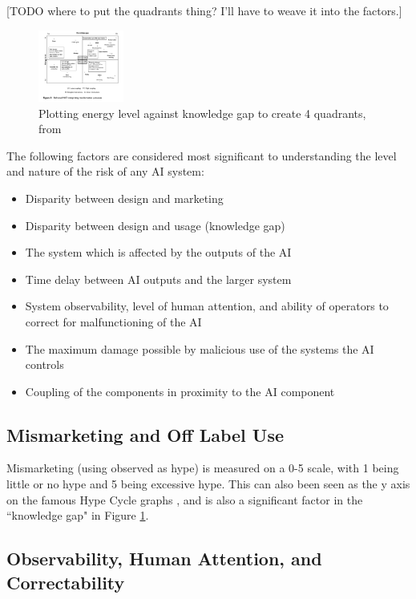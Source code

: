\documentclass[11pt]{article}
\begin{document}
[TODO where to put the quadrants thing? I'll have to weave it into the factors.]
\begin{figure}[h]
    \centering
    \includegraphics[width=0.25\textwidth]{images/reframed-nat-2axis}
    \caption{Plotting energy level against knowledge gap to create 4 quadrants, from
    \cite{shrivastava2009normal}}
    \label{fig:quad}
\end{figure}



The following factors are considered most significant to understanding the level and nature of
the risk of any AI system:

\begin{itemize}
    \item Disparity between design and marketing
    \item Disparity between design and usage (knowledge gap)
    \item The system which is affected by the outputs of the AI
    \item Time delay between AI outputs and the larger system
    \item System observability, level of human attention, and ability of operators to correct for
            malfunctioning of the AI
    \item The maximum damage possible by malicious use of the systems the AI controls
    \item Coupling of the components in proximity to the AI component
\end{itemize}

\subsection{Mismarketing and Off Label Use}

Mismarketing (using observed as hype) is measured on a 0-5 scale, with 1 being little or no hype and
5 being excessive hype. This can also been seen as the y axis on the famous Hype Cycle graphs
\cite{oleary2008hype}, and is also a significant factor in the ``knowledge gap" in Figure
\ref{fig:quad}. 

\subsection{Observability, Human Attention, and Correctability}
\end{document}
